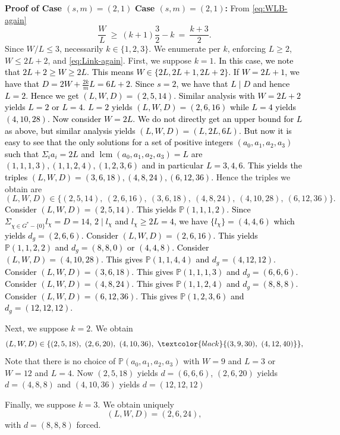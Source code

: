 \documentclass[12pt,twoside,]{amsart}
\theoremstyle{plain}
\theoremstyle{definition}
\begin{document}
\color{black}

\noindent\textbf{Proof of Case $(s,m)=(2,1)$}\label{s = 2, m = 1}
\textbf{Case $(s,m)=(2,1)$:}
From \eqref{eq:WLB-again}
\[
\frac{W}{L}\ \ge\ (k+1)\frac{3}{2}-k\ =\ \frac{k+3}{2}.
\]
Since $W/L\le 3$, necessarily $k\in\{1,2,3\}$. We enumerate per $k$, enforcing $L\ge 2$, $W\le 2L+2$, and \eqref{eq:Link-again}. First, we suppose $k=1$. \textcolor{black}{In this case, we note that $2L+2 \geq W \geq 2L$. This means $W \in \{2L, 2L+1, 2L+2\}$. If $W = 2L+1$, we have that $D = 2W+\frac{2k}{m}L = 6L+2$. Since $s = 2$, we have that $L \mid D$ and hence $L = 2$. Hence we get $(L,W,D) = (2,5,14)$. Similar analysis with $W = 2L+2$ yields $L = 2$ or $L = 4$. $L = 2$ yields $(L,W,D) = (2,6,16)$ while $L = 4$ yields $(4,10,28)$. Now consider $W = 2L$. We do not directly get an upper bound for $L$ as above, but similar analysis yields $(L,W,D) = (L,2L,6L)$. But now it is easy to see that the only solutions for a set of positive integers $(a_0,a_1,a_2,a_3)$ such that $\Sigma_ia_i = 2L$ and $\operatorname{lcm}(a_0,a_1,a_2,a_3) = L$ are $(1,1,1,3), (1,1,2,4), (1,2,3,6)$ and in particular $L = 3,4,6$. This yields the triples $(L,W,D) = (3,6,18), (4,8,24), (6,12,36)$.} Hence the triples we obtain are
\[
(L,W,D)\in\{(2,5,14),\ (2,6,16),\ (3,6,18),\ (4,8,24),\ (4,10,28),\ (6,12,36)\}.
\]
\textcolor{black}{Consider $(L,W,D) = (2,5,14)$. This yields $\mathbb{P}(1,1,1,2)$. Since $\Sigma_{\chi \in G^*-\{0\}}l_{\chi} = D = 14$, $2 \mid l_{\chi}$ and $l_{\chi} \geq 2L = 4$, we have $\{l_{\chi}\} = (4,4,6)$ which yields $d_g = (2,6,6)$. Consider $(L,W,D) = (2,6,16)$. This yields $\mathbb{P}(1,1,2,2)$ and $d_g = (8,8,0)$ or $(4,4,8)$. Consider $(L,W,D) = (4,10,28)$. This gives $\mathbb{P}(1,1,4,4)$ and $d_g = (4,12,12)$. Consider $(L,W,D) = (3,6,18)$. This gives $\mathbb{P}(1,1,1,3)$ and $d_g = (6,6,6)$. Consider $(L,W,D) = (4,8,24)$. This gives $\mathbb{P}(1,1,2,4)$ and $d_g = (8,8,8)$. Consider $(L,W,D) = (6,12,36)$. This gives $\mathbb{P}(1,2,3,6)$ and $d_g = (12,12,12)$.}

Next, we suppose $k=2$. We obtain
\[
(L,W,D)\in\{(2,5,18),\ (2,6,20),\ (4,10,36),\ \textcolor{black}{(3,9,30),\ (4,12,40)} \},
\]
Note that there is no choice of $\mathbb{P}(a_0,a_1,a_2,a_3)$ with $W = 9$ and $L = 3$ or $W = 12$ and $L = 4$. Now $(2,5,18)$ yields $d=(6,6,6)$, $(2,6,20)$ yields $d = (4,8,8)$ and $(4,10,36)$ yields $d=(12,12,12)$   

Finally, we suppose $k=3$. We obtain uniquely
\[
(L,W,D)=(2,6,24),
\]
with $d=(8,8,8)$ forced.
\end{document}
